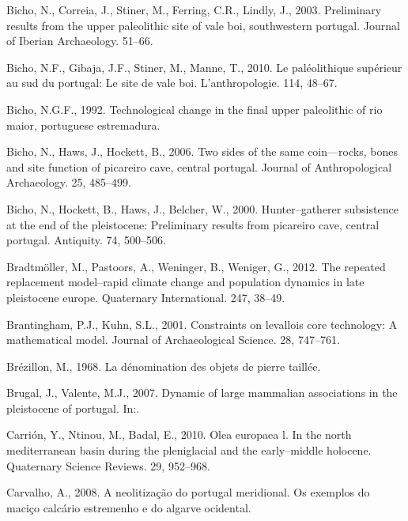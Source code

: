 \documentclass[12pt,twoside]{reedthesis}
\begin{document}
\leavevmode\hypertarget{ref-bicho2003}{}%
Bicho, N., Correia, J., Stiner, M., Ferring, C.R., Lindly, J., 2003. Preliminary results from the upper paleolithic site of vale boi, southwestern portugal. Journal of Iberian Archaeology. 51--66.

\leavevmode\hypertarget{ref-bichoetal2010}{}%
Bicho, N.F., Gibaja, J.F., Stiner, M., Manne, T., 2010. Le paléolithique supérieur au sud du portugal: Le site de vale boi. L'anthropologie. 114, 48--67.

\leavevmode\hypertarget{ref-bicho1992}{}%
Bicho, N.G.F., 1992. Technological change in the final upper paleolithic of rio maior, portuguese estremadura.

\leavevmode\hypertarget{ref-bicho2006}{}%
Bicho, N., Haws, J., Hockett, B., 2006. Two sides of the same coin---rocks, bones and site function of picareiro cave, central portugal. Journal of Anthropological Archaeology. 25, 485--499.

\leavevmode\hypertarget{ref-bichoetal2000}{}%
Bicho, N., Hockett, B., Haws, J., Belcher, W., 2000. Hunter--gatherer subsistence at the end of the pleistocene: Preliminary results from picareiro cave, central portugal. Antiquity. 74, 500--506.

\leavevmode\hypertarget{ref-bradtmoller2012}{}%
Bradtmöller, M., Pastoors, A., Weninger, B., Weniger, G., 2012. The repeated replacement model--rapid climate change and population dynamics in late pleistocene europe. Quaternary International. 247, 38--49.

\leavevmode\hypertarget{ref-brantingham2001}{}%
Brantingham, P.J., Kuhn, S.L., 2001. Constraints on levallois core technology: A mathematical model. Journal of Archaeological Science. 28, 747--761.

\leavevmode\hypertarget{ref-brezillon1968}{}%
Brézillon, M., 1968. La dénomination des objets de pierre taillée.

\leavevmode\hypertarget{ref-brugal2007}{}%
Brugal, J., Valente, M.J., 2007. Dynamic of large mammalian associations in the pleistocene of portugal. In:.

\leavevmode\hypertarget{ref-carrion2010}{}%
Carrión, Y., Ntinou, M., Badal, E., 2010. Olea europaea l. In the north mediterranean basin during the pleniglacial and the early--middle holocene. Quaternary Science Reviews. 29, 952--968.

\leavevmode\hypertarget{ref-carvalho2008}{}%
Carvalho, A., 2008. A neolitização do portugal meridional. Os exemplos do maciço calcário estremenho e do algarve ocidental.
\end{document}
